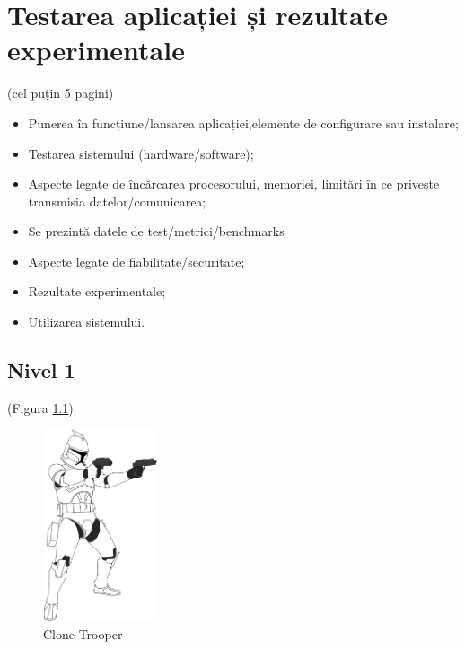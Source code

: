 \iffalse
\chapter{Testarea aplicației și rezultate experimentale}
\label{cap:cap4}

(cel puțin 5 pagini)

\begin{itemize}
    \item Punerea în funcțiune/lansarea aplicației,elemente de configurare sau instalare;
    \item Testarea sistemului (hardware/software);
    \item Aspecte legate de încărcarea procesorului, memoriei, limitări în ce privește transmisia datelor/comunicarea;
    \item Se prezintă datele de test/metrici/benchmarks
    \item Aspecte legate de fiabilitate/securitate;
    \item Rezultate experimentale;
    \item Utilizarea sistemului. 
\end{itemize}

\vspace{2cm}

\section{Nivel 1}
\label{cap:cap4:nivel1}

\textcolor{gray}{\lipsum}  (Figura \ref{fig:clone_trooper})

\begin{figure}[H]
    \centering
    \includegraphics[width=0.3\textwidth]{continut/capitol4/figuri/clone_trooper.png}
    \caption{Clone Trooper\protect\footnotemark}
    \label{fig:clone_trooper}
\end{figure}

